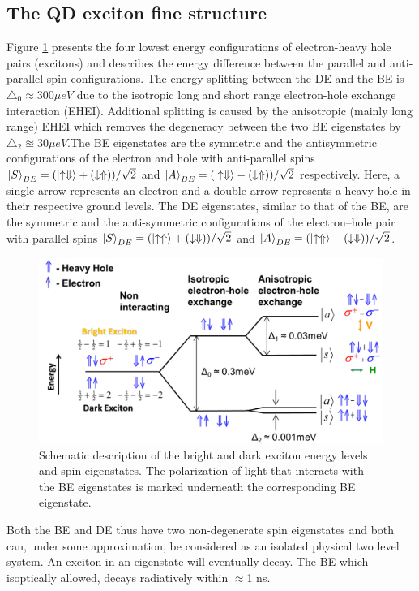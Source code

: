 \subsection{The QD exciton fine structure}
Figure \ref{fig:energy_structure}  presents the four lowest energy configurations of electron-heavy hole pairs (excitons) and describes the energy difference between the parallel and anti-parallel spin configurations. The energy splitting between the DE and the BE is $\triangle_0 \approx 300 \mu eV$ due to the isotropic long and short range electron-hole exchange interaction (EHEI). Additional splitting is caused by the anisotropic (mainly long range) EHEI which removes the degeneracy between the two BE eigenstates by $\triangle_2 \approxeq 30 \mu eV $.The BE eigenstates are the symmetric and the antisymmetric configurations of the electron and hole with anti-parallel spins $ \ket{S}_{BE} = (\ket{\uparrow\Downarrow}+(\downarrow\Uparrow))/\sqrt{2}$ and  $ \ket{A}_{BE} = (\ket{\uparrow\Downarrow}-(\downarrow\Uparrow))/\sqrt{2}$ respectively. Here, a single arrow represents an electron and a double-arrow represents a heavy-hole in their respective ground levels. The DE eigenstates, similar to that of the BE, are the symmetric and the anti-symmetric configurations of the electron–hole pair with parallel spins $ \ket{S}_{DE} = (\ket{\uparrow\Uparrow}+(\downarrow\Downarrow))/\sqrt{2}$ and $ \ket{A}_{DE} = (\ket{\uparrow\Uparrow}-(\downarrow\Downarrow))/\sqrt{2}$.
\begin{figure}[H]
	\centering
	\includegraphics[scale=0.32]{figures/energy_structure.png}
	\caption{Schematic description of the bright and dark exciton energy levels and spin eigenstates. The polarization of light that interacts with the BE eigenstates is marked underneath the corresponding BE eigenstate.}
	\label{fig:energy_structure}
\end{figure}
Both the BE and DE thus have two non-degenerate spin eigenstates and both can, under some approximation, be considered as an isolated physical two level system. An exciton in an eigenstate will eventually decay. The BE which isoptically allowed, decays radiatively within $\approx$1 ns.

